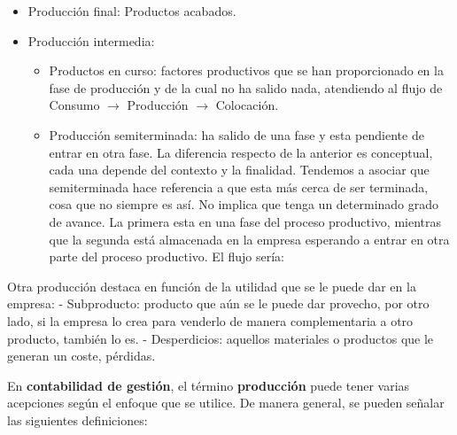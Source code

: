 \documentclass[12pt]{report} %
\providecommand{\tightlist}{%
  \setlength{\itemsep}{0pt}\setlength{\parskip}{0pt}}
\begin{document}
\begin{itemize}
\tightlist
\item
  Producción final: Productos acabados.
\item
  Producción intermedia:

  \begin{itemize}
  \item
    Productos en curso: factores productivos que se han proporcionado en
    la fase de producción y de la cual no ha salido nada, atendiendo al
    flujo de Consumo \(\rightarrow\) Producción \(\rightarrow\)
    Colocación.
  \item
    Producción semiterminada: ha salido de una fase y esta pendiente de
    entrar en otra fase. La diferencia respecto de la anterior es
    conceptual, cada una depende del contexto y la finalidad. Tendemos a
    asociar que semiterminada hace referencia a que esta más cerca de
    ser terminada, cosa que no siempre es así. No implica que tenga un
    determinado grado de avance. La primera esta en una fase del proceso
    productivo, mientras que la segunda está almacenada en la empresa
    esperando a entrar en otra parte del proceso productivo. El flujo
    sería:

  \end{itemize}
\end{itemize}

Otra producción destaca en función de la utilidad que se le puede dar en
la empresa: - Subproducto: producto que aún se le puede dar provecho,
por otro lado, si la empresa lo crea para venderlo de manera
complementaria a otro producto, también lo es. - Desperdicios: aquellos
materiales o productos que le generan un coste, pérdidas.

En \textbf{contabilidad de gestión}, el término \textbf{producción}
puede tener varias acepciones según el enfoque que se utilice. De manera
general, se pueden señalar las siguientes definiciones:
\end{document}
